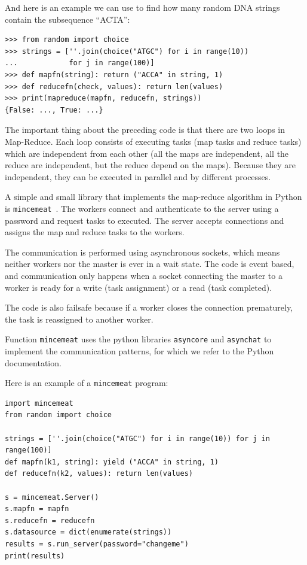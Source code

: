 \documentclass[justified, sixbynine]{tufte-book}
\def\ft{\small\tt}
\theoremstyle{plain}%
\newtheorem * {corollary}{Corollary}
\theoremstyle{definition}
\theoremstyle{remark}
\newtheorem * {remark}{Remark}
\newtheorem * {note}{Note}
\begin{document}
\begin{fullwidth}
And here is an example we can use to find how many random DNA strings contain the subsequence ``ACTA'':

\begin{lstlisting}
>>> from random import choice
>>> strings = [''.join(choice("ATGC") for i in range(10))
...            for j in range(100)]
>>> def mapfn(string): return ("ACCA" in string, 1)
>>> def reducefn(check, values): return len(values)
>>> print(mapreduce(mapfn, reducefn, strings))
{False: ..., True: ...}
\end{lstlisting}

The important thing about the preceding code is that there are two loops in Map-Reduce. Each loop consists of executing tasks (map tasks and reduce tasks) which are independent from each other (all the maps are independent, all the reduce are independent, but the reduce depend on the maps). Because they are independent, they can be executed in parallel and by different processes.

A simple and small library that implements the map-reduce algorithm in Python is {\ft mincemeat}~\cite{mincemeat}. The workers connect and authenticate to the server using a password and request tasks to executed. The server accepts connections and assigns the map and reduce tasks to the workers.

The communication is performed using asynchronous sockets, which means neither workers nor the master is ever in a wait state. The code is event based, and communication only happens when a socket connecting the master to a worker is ready for a write (task assignment) or a read (task completed).

The code is also failsafe because if a worker closes the connection prematurely, the task is reassigned to another worker.

Function {\ft mincemeat} uses the python libraries {\ft asyncore} and {\ft asynchat} to implement the communication patterns, for which we refer to the Python documentation.

Here is an example of a {\ft mincemeat} program:

\begin{lstlisting}
import mincemeat
from random import choice

strings = [''.join(choice("ATGC") for i in range(10)) for j in range(100)]
def mapfn(k1, string): yield ("ACCA" in string, 1)
def reducefn(k2, values): return len(values)

s = mincemeat.Server()
s.mapfn = mapfn
s.reducefn = reducefn
s.datasource = dict(enumerate(strings))
results = s.run_server(password="changeme")
print(results)
\end{lstlisting}


\end{fullwidth}
\end{document}
